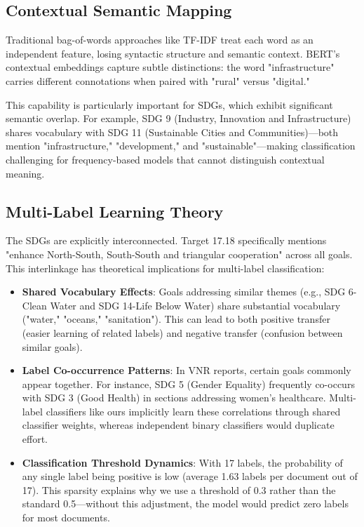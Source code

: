 \documentclass[12pt,a4paper]{article}
\begin{document}
\subsection{Contextual Semantic Mapping}

Traditional bag-of-words approaches like TF-IDF treat each word as an independent feature, losing syntactic structure and semantic context. BERT's contextual embeddings capture subtle distinctions: the word "infrastructure" carries different connotations when paired with "rural" versus "digital."

This capability is particularly important for SDGs, which exhibit significant semantic overlap. For example, SDG 9 (Industry, Innovation and Infrastructure) shares vocabulary with SDG 11 (Sustainable Cities and Communities)—both mention "infrastructure," "development," and "sustainable"—making classification challenging for frequency-based models that cannot distinguish contextual meaning.

\subsection{Multi-Label Learning Theory}

The SDGs are explicitly interconnected. Target 17.18 specifically mentions "enhance North-South, South-South and triangular cooperation" across all goals. This interlinkage has theoretical implications for multi-label classification:

\begin{itemize}
    \item \textbf{Shared Vocabulary Effects}: Goals addressing similar themes (e.g., SDG 6-Clean Water and SDG 14-Life Below Water) share substantial vocabulary ("water," "oceans," "sanitation"). This can lead to both positive transfer (easier learning of related labels) and negative transfer (confusion between similar goals).
    \item \textbf{Label Co-occurrence Patterns}: In VNR reports, certain goals commonly appear together. For instance, SDG 5 (Gender Equality) frequently co-occurs with SDG 3 (Good Health) in sections addressing women's healthcare. Multi-label classifiers like ours implicitly learn these correlations through shared classifier weights, whereas independent binary classifiers would duplicate effort.
    \item \textbf{Classification Threshold Dynamics}: With 17 labels, the probability of any single label being positive is low (average 1.63 labels per document out of 17). This sparsity explains why we use a threshold of 0.3 rather than the standard 0.5—without this adjustment, the model would predict zero labels for most documents.
\end{itemize}
\end{document}
